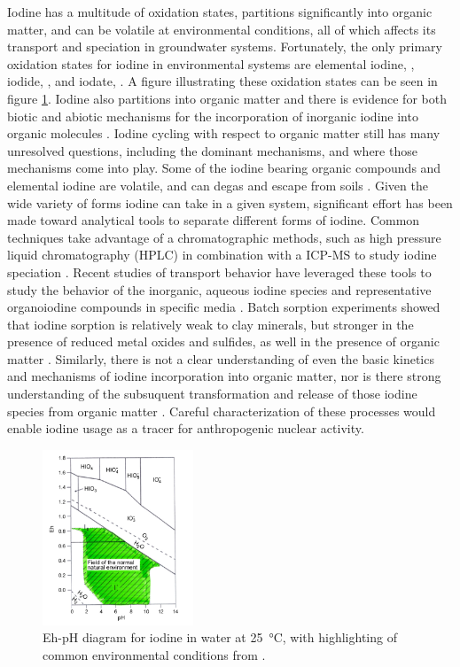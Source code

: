 \documentclass[twoside,12pt,titlepage]{article}
\begin{document}
\par Iodine has a multitude of oxidation states, partitions significantly into organic matter, and can be volatile at environmental conditions, all of which affects its transport and speciation in groundwater systems. Fortunately, the only primary oxidation states for iodine in environmental systems are elemental iodine, , iodide, , and iodate,  \cite{Hou2009}. A figure illustrating these oxidation states can be seen in figure \ref{fig:IodineSpeciation}. Iodine also partitions into organic matter and there is evidence for both biotic and abiotic mechanisms for the incorporation of inorganic iodine into organic molecules \cite{Gilfedder2010, Yamaguchi2008}. Iodine cycling with respect to organic matter still has many unresolved questions, including the dominant mechanisms, and where those mechanisms come into play. Some of the iodine bearing organic compounds and elemental iodine are volatile, and can degas and escape from soils \cite{Hu2009}. Given the wide variety of forms iodine can take in a given system, significant effort has been made toward analytical tools to separate different forms of iodine. Common techniques take advantage of a chromatographic methods, such as high pressure liquid chromatography (HPLC) in combination with a ICP-MS to study iodine speciation \cite{Wuilloud2005}. Recent studies of transport behavior have leveraged these tools to study the behavior of the inorganic, aqueous iodine species and representative organoiodine compounds in specific media \cite{Hu2005}. Batch sorption experiments showed that iodine sorption is relatively weak to clay minerals, but stronger in the presence of reduced metal oxides and sulfides, as well in the presence of organic matter \cite{Assemi1994,Fuhrmann1998}. Similarly, there is not a clear understanding of even the basic kinetics and mechanisms of iodine incorporation into organic matter, nor is there strong understanding of the subsuquent transformation and release of those iodine species from organic matter \cite{Yamaguchi2008}. Careful characterization of these processes would enable iodine usage as a tracer for anthropogenic nuclear activity.

\begin{figure}
\centering
\includegraphics[width = 0.4\textwidth]{IodineSpeciation.png}
\caption{Eh-pH diagram for iodine in water at \SI{25}{\degreeCelsius}, with highlighting of common environmental conditions from \cite{Hou2009}.}
\label{fig:IodineSpeciation}
\end{figure}
\end{document}
